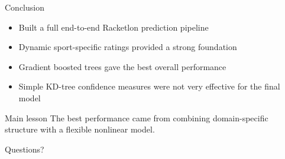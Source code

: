 \documentclass[aspectratio=169,11pt]{beamer}
\begin{document}
\begin{frame}{Conclusion}
    \begin{itemize}
        \item Built a full end-to-end Racketlon prediction pipeline
        \item Dynamic sport-specific ratings provided a strong foundation
        \item Gradient boosted trees gave the best overall performance
        \item Simple KD-tree confidence measures were not very effective for the final model
    \end{itemize}

    \vspace{0.8em}

    \begin{block}{Main lesson}
        The best performance came from combining domain-specific structure with a flexible nonlinear model.
    \end{block}
\end{frame}

\begin{frame}[plain]
    \begin{center}
        {\Huge Questions?}
    \end{center}
\end{frame}
\end{document}
